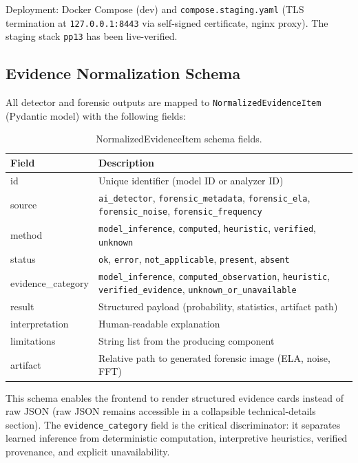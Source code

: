 \documentclass[10pt,conference,compsoc]{IEEEtran}
\begin{document}
Deployment: Docker Compose (dev) and \texttt{compose.staging.yaml} (TLS termination at \texttt{127.0.0.1:8443} via self-signed certificate, nginx proxy). The staging stack \texttt{pp13} has been live-verified.

\subsection{Evidence Normalization Schema}
\label{sec:evidence-schema}

All detector and forensic outputs are mapped to \texttt{NormalizedEvidenceItem} (Pydantic model) with the following fields:

\begin{table}[t]
\caption{NormalizedEvidenceItem schema fields.}
\label{tab:evidence-schema}
\centering
\begin{tabular}{>{\ttfamily}l p{5.5cm}}
\toprule
Field & Description \\
\midrule
id & Unique identifier (model ID or analyzer ID) \\
source & \texttt{ai\_detector}, \texttt{forensic\_metadata}, \texttt{forensic\_ela}, \texttt{forensic\_noise}, \texttt{forensic\_frequency} \\
method & \texttt{model\_inference}, \texttt{computed}, \texttt{heuristic}, \texttt{verified}, \texttt{unknown} \\
status & \texttt{ok}, \texttt{error}, \texttt{not\_applicable}, \texttt{present}, \texttt{absent} \\
evidence\_category & \texttt{model\_inference}, \texttt{computed\_observation}, \texttt{heuristic}, \texttt{verified\_evidence}, \texttt{unknown\_or\_unavailable} \\
result & Structured payload (probability, statistics, artifact path) \\
interpretation & Human-readable explanation \\
limitations & String list from the producing component \\
artifact & Relative path to generated forensic image (ELA, noise, FFT) \\
\bottomrule
\end{tabular}
\end{table}

This schema enables the frontend to render structured evidence cards instead of raw JSON (raw JSON remains accessible in a collapsible technical-details section).
The \texttt{evidence\_category} field is the critical discriminator: it separates learned inference from deterministic computation, interpretive heuristics, verified provenance, and explicit unavailability.
\end{document}
